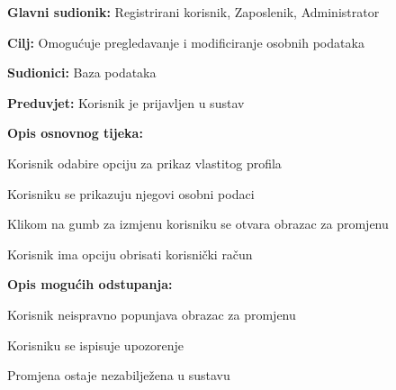 \noindent {}
\begin{packed_item}
	
	\item \textbf{Glavni sudionik: } Registrirani korisnik, Zaposlenik, Administrator
	\item  \textbf{Cilj:} Omogućuje pregledavanje i modificiranje osobnih podataka
	\item  \textbf{Sudionici:} Baza podataka
	\item  \textbf{Preduvjet:} Korisnik je prijavljen u sustav
	\item  \textbf{Opis osnovnog tijeka:}
	
	\item[] \begin{packed_enum}
		
		\item Korisnik odabire opciju za prikaz vlastitog profila
		\item Korisniku se prikazuju njegovi osobni podaci
		\item Klikom na gumb za izmjenu korisniku se otvara obrazac za promjenu
		\item Korisnik ima opciju obrisati korisnički račun
		
	\end{packed_enum}
	
	\item  \textbf{Opis mogućih odstupanja:}
	
	\item[] \begin{packed_item}
		
		\item[2.a] Korisnik neispravno popunjava obrazac za promjenu
		\item[] \begin{packed_enum}
			
			\item Korisniku se ispisuje upozorenje
			\item Promjena ostaje nezabilježena u sustavu
			
		\end{packed_enum}
	\end{packed_item}
\end{packed_item}

